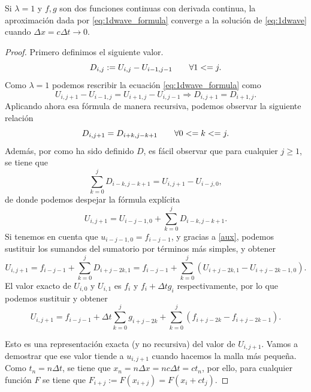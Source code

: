 \begin{teorema}
	Si $\lambda=1$ y $f,g$ son dos funciones continuas con derivada continua, la aproximación dada por \eqref{eq:1dwave_formula} converge a la solución de \eqref{eq:1dwave} cuando $\Delta x = c\Delta t \longrightarrow 0$.
\end{teorema}
\begin{proof}
	Primero definimos el siguiente valor.
	\begin{equation}
		D_{i,j} := U_{i,j} - U_{i-1,j-1} \hspace{20px} \forall 1<=j.
	\end{equation}
	Como $\lambda = 1$ podemos rescribir la ecuación \eqref{eq:1dwave_formula} como 
	\begin{equation}
		U_{i,j+1} - U_{i-1,j} = U_{i+1,j} - U_{i,j-1} \Rightarrow D_{i,j+1} = D_{i+1,j}.
	\end{equation}
	Aplicando ahora esa fórmula de manera recursiva, podemos observar la siguiente relación
	\begin{equation}
		\label{aux}
		D_{i,j+1} = D_{i+k,j-k+1} \hspace{20px} \forall 0<=k<=j.
	\end{equation}
	Además, por como ha sido definido $D$, es fácil observar que para cualquier $j\geq1$, se tiene que
	\begin{equation}
		\sum_{k=0}^{j}D_{i-k,j-k+1} = U_{i,j+1} - U_{i-j,0},
	\end{equation}
	de donde podemos despejar la fórmula explícita
	\begin{equation}
		U_{i,j+1} = U_{i-j-1,0} + \sum_{k=0}^{j}D_{i-k,j-k+1}.
	\end{equation}
	Si tenemos en cuenta que $u_{i-j-1,0}=f_{i-j-1}$, y gracias a \eqref{aux}, podemos sustituir los sumandos del sumatorio por términos más simples, y obtener
	\begin{equation}
		U_{i,j+1} = f_{i-j-1} + \sum_{k=0}^{j}D_{i+j-2k,1} = f_{i-j-1} + \sum_{k=0}^{j}(U_{i+j-2k,1} - U_{i+j-2k-1,0}).
	\end{equation}
	El valor exacto de $U_{i,0}$ y $U_{i,1}$ es $f_{i}$ y $f_i+\Delta tg_i$ respectivamente, por lo que podemos sustituir y obtener
	\begin{equation}
		\label{aux2}
		U_{i,j+1} = f_{i-j-1} + \Delta t\sum_{k=0}^{j}g_{i+j-2k} + \sum_{k=0}^{j}(f_{i+j-2k}-f_{i+j-2k-1}).
	\end{equation}
	
	Esto es una representación exacta (y no recursiva) del valor de $U_{i,j+1}$. Vamos a demostrar que ese valor tiende a $u_{i,j+1}$ cuando hacemos la malla más pequeña.
	Como $t_n=n\Delta t$, se tiene que $x_n=n\Delta x=nc\Delta t=ct_{n}$, por ello, para cualquier función $F$ se tiene que $F_{i+j}:=F(x_{i+j})=F(x_i+ct_j)$.
	

\end{proof}
